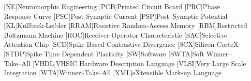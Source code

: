 [NE]{Neuromorphic Engineering}
[PCB]{Printed Circuit Board}
[PRC]{Phase Response Curve}
[PSC]{Post-Synaptic Current}
[PSP]{Post--Synaptic Potential}
[KL]{Kullback-Leibler}
[RRAM]{Resistive Random-Access Memory}
[RBM]{Restricted Boltzmann Machine}
[ROC]{Receiver Operator Characteristic}
[SAC]{Selective Attention Chip}
[SCD]{Spike-Based Contrastive Divergence}
[SCX]{Silicon CorteX}
[STDP]{Spike Time Dependent Plasticity}
[SW]{Software}
[SWTA]{Soft Winner--Take--All}
[VHDL]{VHSIC Hardware Description Language}
[VLSI]{Very  Large  Scale  Integration}
[WTA]{Winner--Take--All}
[XML]{eXtensible Mark-up Language}
